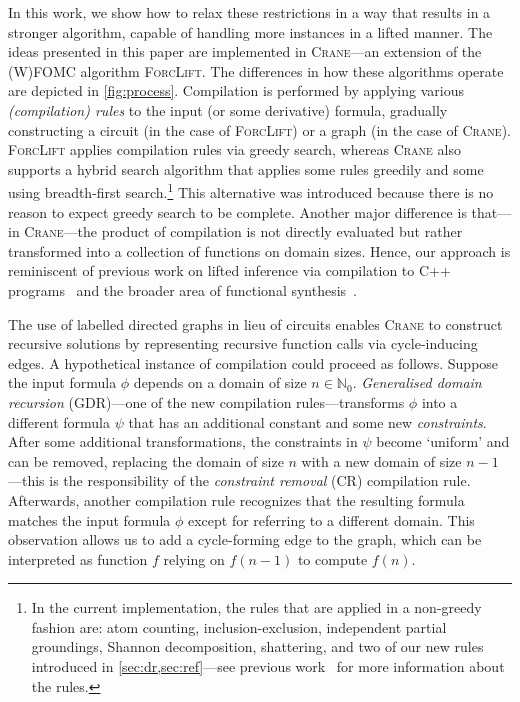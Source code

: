 \documentclass{article}
\begin{document}


In this work, we show how to relax these restrictions in a way that results in a
stronger algorithm, capable of handling more instances in a lifted manner. The
ideas presented in this paper are implemented in \textsc{Crane}---an extension
of the (W)FOMC algorithm \textsc{ForcLift}. The differences in how these
algorithms operate are depicted in \cref{fig:process}. Compilation is performed
by applying various \emph{(compilation) rules} to the input (or some derivative)
formula, gradually constructing a circuit (in the case of \textsc{ForcLift}) or
a graph (in the case of \textsc{Crane}). \textsc{ForcLift} applies compilation
rules via greedy search, whereas \textsc{Crane} also supports a hybrid search
algorithm that applies some rules greedily and some using breadth-first
search.\footnote{In the current implementation, the rules that are applied in a
  non-greedy fashion are: atom counting, inclusion-exclusion, independent
  partial groundings, Shannon decomposition, shattering, and two of our new
  rules introduced in \cref{sec:dr,sec:ref}---see previous
  work~\cite{DBLP:conf/ijcai/BroeckTMDR11} for more information about the
  rules.} This alternative was introduced because there is no reason to expect
greedy search to be complete. Another major difference is that---in
\textsc{Crane}---the product of compilation is not directly evaluated but rather
transformed into a collection of functions on domain sizes. Hence, our approach
is reminiscent of previous work on lifted inference via compilation to C++
programs~\cite{DBLP:conf/kr/KazemiP16} and the broader area of functional
synthesis~\cite{DBLP:conf/cav/GoliaRM20,DBLP:conf/pldi/KuncakMPS10,sanathanan1963transfer}.


The use of labelled directed graphs in lieu of circuits enables \textsc{Crane}
to construct recursive solutions by representing recursive function calls via
cycle-inducing edges. A hypothetical instance of compilation could proceed as
follows. Suppose the input formula $\phi$ depends on a domain of size
$n \in \mathbb{N}_{0}$. \emph{Generalised domain recursion} (GDR)---one of the
new compilation rules---transforms $\phi$ into a different formula $\psi$ that
has an additional constant and some new \emph{constraints}. After some
additional transformations, the constraints in $\psi$ become `uniform' and can
be removed, replacing the domain of size $n$ with a new domain of size
$n-1$---this is the responsibility of the \emph{constraint removal} (CR)
compilation rule. Afterwards, another compilation rule recognizes that the
resulting formula matches the input formula $\phi$ except for referring to a
different domain. This observation allows us to add a cycle-forming edge to the
graph, which can be interpreted as function $f$ relying on $f(n-1)$ to compute
$f(n)$.
\end{document}
